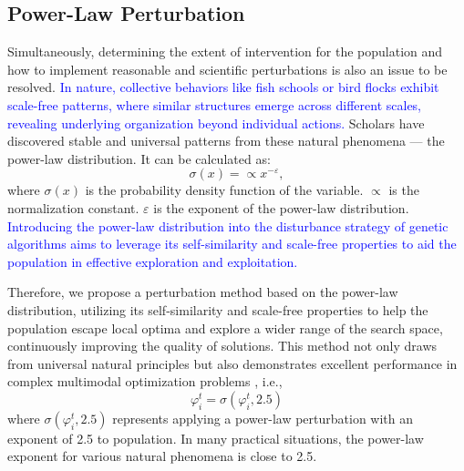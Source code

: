 \documentclass[journal,twoside]{IEEEtran}
\begin{document}
\subsection{Power-Law Perturbation}
Simultaneously, determining the extent of intervention for the population and how to implement reasonable and scientific perturbations is also an issue to be resolved. \textcolor{blue}{In nature, collective behaviors like fish schools or bird flocks exhibit scale-free patterns, where similar structures emerge across different scales, revealing underlying organization beyond individual actions.} Scholars have discovered stable and universal patterns from these natural phenomena — the power-law distribution. It can be calculated as:
\begin{equation}\label{E13}
	\sigma(x) = \varpropto x^{-\varepsilon},
\end{equation}
where $\sigma(x)$ is the probability density function of the variable. $\varpropto$ is the normalization constant. $\varepsilon$ is the exponent of the power-law distribution. \textcolor{blue}{Introducing the power-law distribution into the disturbance strategy of genetic algorithms aims to leverage its self-similarity and scale-free properties to aid the population in effective exploration and exploitation.}

Therefore, we propose a perturbation method based on the power-law distribution, utilizing its self-similarity and scale-free properties to help the population escape local optima and explore a wider range of the search space, continuously improving the quality of solutions. This method not only draws from universal natural principles but also demonstrates excellent performance in complex multimodal optimization problems \cite{zhou2020power}, i.e.,
\begin{equation}\label{E14}
\varphi_i^{t}=	\sigma\left(\varphi_i^{t}, 2.5\right)
	\end{equation}
where $\sigma\left(\varphi_i^{t}, 2.5\right)$ represents applying a power-law perturbation with an exponent of 2.5 to population. In many practical situations, the power-law exponent for various natural phenomena is close to 2.5. 
\end{document}
